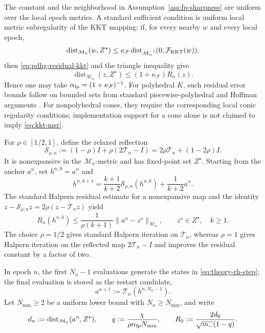 \documentclass[letterpaper]{article} %
\theoremstyle{definition}
\theoremstyle{remark}
\begin{document}
The constant and the neighborhood in Assumption~\ref{ass:fp-sharpness} are
uniform over the local epoch metrics.  A standard sufficient condition is
uniform local metric subregularity of the KKT mapping: if, for every nearby
$w$ and every local epoch,
\begin{equation}
\label{eq:kkt-msr}
    \operatorname{dist}_{\mathcal M_n}(w,Z^\star)
    \le
    \kappa_{\mathcal F}
    \operatorname{dist}_{\mathcal M_n^{-1}}
        (0,\mathcal F_{\rm KKT}(w)),
\end{equation}
then \eqref{eq:pdhg-residual-kkt} and the triangle inequality give
\[
    \operatorname{dist}_{\mathcal M_n}(z,Z^\star)
    \le
    (1+\kappa_{\mathcal F})R_n(z).
\]
Hence one may take
$\alpha_{\rm fp}=(1+\kappa_{\mathcal F})^{-1}$.  For polyhedral $K$, such
residual error bounds follow on bounded sets from standard
piecewise-polyhedral and Hoffman arguments
\cite{robinson1981continuity}.  For nonpolyhedral cones, they require the
corresponding local conic regularity conditions; implementation support for a
cone alone is not claimed to imply \eqref{eq:kkt-msr}.

For $\rho\in[1/2,1]$, define the relaxed reflection
\begin{equation}
\label{eq:relaxed-reflection-map}
    \mathcal S_{\rho,n}
    :=
    (1-\rho)I+\rho(2\mathcal T_n-I)
    =
    2\rho\mathcal T_n+(1-2\rho)I.
\end{equation}
It is nonexpansive in the $\mathcal M_n$-metric and has fixed-point set
$Z^\star$.  Starting from the anchor $a^n$, set $h^{n,0}=a^n$ and
\begin{equation}
\label{eq:theory-rh-step}
    h^{n,k+1}
    =
    \frac{k+1}{k+2}\mathcal S_{\rho,n}(h^{n,k})
    +
    \frac{1}{k+2}a^n.
\end{equation}
The standard Halpern residual estimate for a nonexpansive map
\cite{lu2024restarted} and the identity
$z-\mathcal S_{\rho,n}z=2\rho(z-\mathcal T_nz)$ yield
\begin{equation}
\label{eq:rh-residual-decay}
    R_n(h^{n,k})
    \le
    \frac{1}{\rho(k+1)}
    \|a^n-z^\star\|_{\mathcal M_n},
    \qquad
    z^\star\in Z^\star,\quad k\ge1.
\end{equation}
The choice $\rho=1/2$ gives standard Halpern iteration on $\mathcal T_n$,
whereas $\rho=1$ gives Halpern iteration on the reflected map
$2\mathcal T_n-I$ and improves the residual constant by a factor of two.

In epoch $n$, the first $N_n-1$ evaluations generate the states in
\eqref{eq:theory-rh-step}; the final evaluation is stored as the restart
candidate,
\begin{equation}
\label{eq:exact-restart-map}
    a^{n+1}
    :=
    \mathcal T_n(h^{n,N_n-1}).
\end{equation}
Let $N_{\min}\ge2$ be a uniform lower bound with
$N_n\ge N_{\min}$, and write
\[
    d_n
    :=
    \operatorname{dist}_{\mathcal M_n}(a^n,Z^\star),
    \qquad
    q
    :=
    \frac{\chi}{\rho\alpha_{\rm fp}N_{\min}},
    \qquad
    R_0
    :=
    \frac{2d_0}{\sqrt{m_-}(1-q)}.
\]
\end{document}
